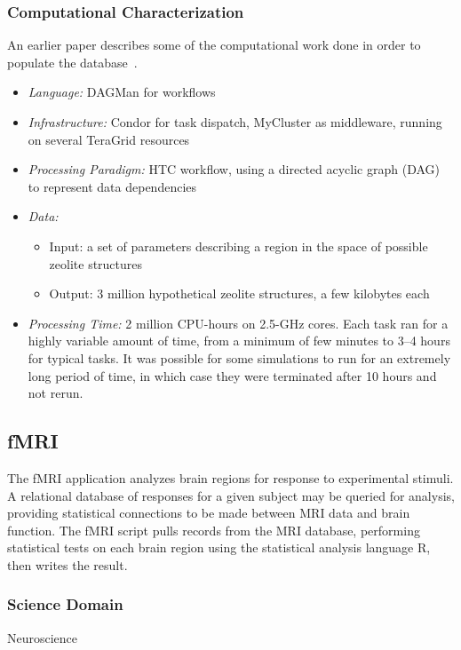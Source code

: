 \documentclass[10pt,letterpaper]{article}
\begin{document}
\subsubsection{Computational Characterization}
An earlier paper describes some of the computational work done
in order to populate the database~\cite{walker-07}.
\begin {itemize}
\item {\em Language:} DAGMan for workflows
\item {\em Infrastructure:} Condor for task dispatch, MyCluster as middleware, running on
                        several TeraGrid resources
\item {\em Processing Paradigm:} HTC workflow, using a directed acyclic graph (DAG) to represent data dependencies
\item {\em Data:} \begin{itemize}
    \item Input: a set of parameters describing a region in the space of possible 
    zeolite structures
    \item Output: 3 million hypothetical zeolite structures, a few kilobytes each
    \end{itemize}
\item {\em Processing Time:} 2 million CPU-hours on 2.5-GHz cores.  Each task ran for a highly variable
            amount of time, from a minimum of few minutes to 3--4 hours for typical tasks.  It was possible for some simulations to run for an extremely long period of time, in which case they were terminated after 10 hours and not rerun.
\end {itemize}


\subsection{fMRI}

The fMRI application analyzes brain regions for response to experimental stimuli. A relational database of responses for a given subject may be queried for analysis, providing statistical connections to be made between MRI data and brain function. The fMRI script pulls records from the MRI database, performing statistical tests on each brain region using the statistical analysis language R, then writes the result.

\subsubsection{Science Domain} Neuroscience
\end{document}
